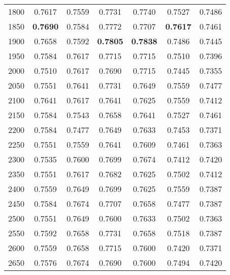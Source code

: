 \documentclass[11pt,a4paper]{article}
\begin{document}
\begin{table*}[th!]
{\begin{tabular}{c|cccccc@{}}
1800           & 0.7617  & 0.7559     & 0.7731   & 0.7740      & 0.7527         & 0.7486            \\
1850           & \textbf{0.7690}  & 0.7584     & 0.7772   & 0.7707      & \textbf{0.7617}         & 0.7461            \\
1900           & 0.7658  & 0.7592     & \textbf{0.7805}   & \textbf{0.7838}      & 0.7486         & 0.7445            \\
1950           & 0.7584  & 0.7617     & 0.7715   & 0.7715      & 0.7510         & 0.7396            \\
2000           & 0.7510  & 0.7617     & 0.7690   & 0.7715      & 0.7445         & 0.7355            \\
2050           & 0.7551  & 0.7641     & 0.7731   & 0.7649      & 0.7559         & 0.7477            \\
2100           & 0.7641  & 0.7617     & 0.7641   & 0.7625      & 0.7559         & 0.7412            \\
2150           & 0.7584  & 0.7543     & 0.7658   & 0.7641      & 0.7527         & 0.7461            \\
2200           & 0.7584  & 0.7477     & 0.7649   & 0.7633      & 0.7453         & 0.7371            \\
2250           & 0.7551  & 0.7559     & 0.7641   & 0.7609      & 0.7461         & 0.7363            \\
2300           & 0.7535  & 0.7600     & 0.7699   & 0.7674      & 0.7412         & 0.7420            \\
2350           & 0.7551  & 0.7617     & 0.7682   & 0.7625      & 0.7502         & 0.7412            \\
2400           & 0.7559  & 0.7649     & 0.7699   & 0.7625      & 0.7559         & 0.7387            \\
2450           & 0.7584  & 0.7674     & 0.7707   & 0.7658      & 0.7477         & 0.7387            \\
2500           & 0.7551  & 0.7649     & 0.7600   & 0.7633      & 0.7502         & 0.7363            \\
2550           & 0.7592  & 0.7658     & 0.7731   & 0.7658      & 0.7518         & 0.7387            \\
2600           & 0.7559  & 0.7658     & 0.7715   & 0.7600      & 0.7420         & 0.7371            \\
2650           & 0.7576  & 0.7674     & 0.7690   & 0.7600      & 0.7494         & 0.7420            \\

\end{tabular}}
\end{table*}
\end{document}
